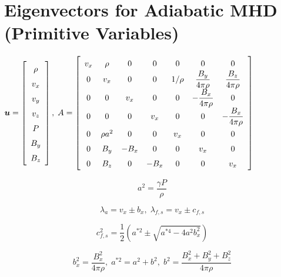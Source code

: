 \newpage

\section{Eigenvectors for Adiabatic MHD (Primitive Variables)}

\begin{center}
$\renewcommand{\arraystretch}{1.5}
\mbox{\boldmath $u$} =
\left[
\begin{array}{c}
\rho \\
v_{x} \\
v_{y} \\
v_{z} \\
P \\
B_{y} \\
B_{z} \\
\end{array}
\right], \;
\renewcommand{\arraystretch}{1.5}
A =
\left[
\begin{array}{ccccccc}
v_x & \rho & 0 & 0 & 0 & 0 & 0 \\
0 & v_x & 0 & 0 & 1/\rho & \displaystyle \frac{B_y}{4\pi\rho} & 
\displaystyle \frac{B_z}{4\pi\rho} \\
0 & 0 & v_x & 0 & 0 & \displaystyle - \frac{B_x}{4\pi\rho} & 0 \\
0 & 0 & 0 & v_x & 0 & 0 & \displaystyle - \frac{B_x}{4\pi\rho} \\
0 & \rho a^2 & 0 & 0 & v_x & 0 & 0 \\
0 & B_y & -B_x & 0 & 0 & v_x & 0 \\
0 & B_z & 0 & -B_x & 0 & 0 & v_x  \\
\end{array}
\right]$\end{center}


\begin{equation}
a^2 = \frac{\gamma P}{\rho}
\end{equation}

\begin{equation}
\lambda_{a} = {v}_{x} \pm b_{x} , \; 
\lambda_{f,s} = {v}_{x} \pm c_{f,s}
\end{equation}

\begin{equation}
c_{f,s}^2 = \frac12 \left( a^{\ast 2} \pm \sqrt{a^{\ast 4} 
- 4 a^2 b_x^2}\right)
\end{equation}

\begin{equation}
b_{x}^2 = \frac{B_{x}^2}{4 \pi {\rho}}, \;
a^{\ast 2} = a^2 + b^{2}, \;
b^2 = \frac{B_{x}^2 + B_{y}^2 + B_{z}^2}{4 \pi {\rho}}
\end{equation}

